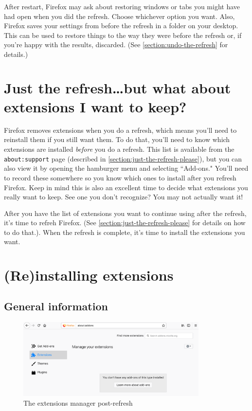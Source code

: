 \documentclass[fontsize=11pt]{article}
\begin{document}
After restart, Firefox may ask about restoring windows or tabs you might have had open when you did the refresh.  Choose whichever option you want.  Also, Firefox saves your settings from before the refresh in a folder on your desktop.  This can be used to restore things to the way they were before the refresh or, if you're happy with the results, discarded.  (See \cref{section:undo-the-refresh} for details.)




\section{Just the refresh\ldots{}but what about extensions I want to keep?}
Firefox removes extensions when you do a refresh, which means you'll need to reinstall them if you still want them.  To do that, you'll need to know which extensions are installed \emph{before} you do a refresh.  This list is available from the \texttt{about:support} page (described in \cref{section:just-the-refresh-please}), but you can also view it by opening the hamburger menu and selecting ``Add-ons."  You'll need to record these somewhere so you know which ones to install after you refresh Firefox.  Keep in mind this is also an excellent time to decide what extensions you really want to keep.  See one you don't recognize?  You may not actually want it!

After you have the list of extensions you want to continue using after the refresh, it's time to refreh Firefox.  (See \cref{section:just-the-refresh-please} for details on how to do that.). When the refresh is complete, it's time to install the extensions you want.





\section{(Re)installing extensions}



\subsection*{General information}

\begin{figure}[h]
	\centering
	\includegraphics[width=0.85\textwidth]{images/extensions-post-refresh.png}
	\caption{The extensions manager post-refresh }
	\label{fig:extensions-post-refresh}
\end{figure}
\end{document}
